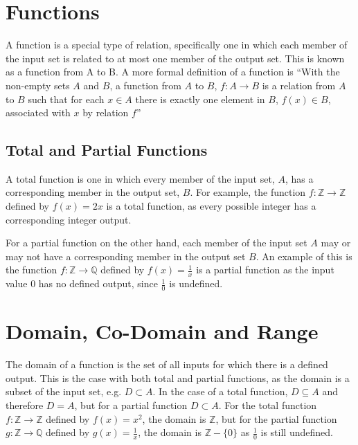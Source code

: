 
\section*{Functions}

A function is a special type of relation, specifically one in which each member of the input set is related to at most
 one member of the output set. This is known as a function from A to B. A more formal definition of a function is
 ``With the non-empty sets $A$ and $B$, a function from $A$ to $B$, $f : A \rightarrow B$ is a relation from $A$ to $B$
 such that for each $x \in A$ there is exactly one element in $B$, $f(x) \in B$, associated with $x$ by relation $f$''

\subsection*{Total and Partial Functions}

A total function is one in which every member of the input set, $A$, has a corresponding member in the output set, $B$.
 For example, the function $f : \mathbb{Z} \rightarrow \mathbb{Z}$ defined by $f(x) = 2x$ is a total function, as every
 possible integer has a corresponding integer output.

For a partial function on the other hand, each member of the input set $A$ may or may not have a corresponding member in
 the output set $B$. An example of this is the function $f : \mathbb{Z} \rightarrow \mathbb{Q}$ defined by
 $f(x) = \frac{1}{x}$ is a partial function as the input value $0$ has no defined output, since $\frac{1}{0}$ is
 undefined.

\section*{Domain, Co-Domain and Range}

The domain of a function is the set of all inputs for which there is a defined output. This is the case with both total
 and partial functions, as the domain is a subset of the input set, e.g. $D \subset A$. In the case of a total function,
 $D \subseteq A$ and therefore $D = A$, but for a partial function $D \subset A$. For the total function
 $f : \mathbb{Z} \rightarrow \mathbb{Z}$ defined by $f(x) = x^2$, the domain is $\mathbb{Z}$, but for the partial
 function $g : \mathbb{Z} \rightarrow \mathbb{Q}$ defined by $g(x) = \frac{1}{x}$, the domain is $\mathbb{Z} - \{0\}$ as
 $\frac{1}{0}$ is still undefined.

